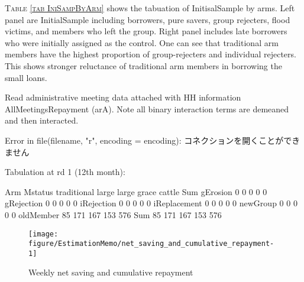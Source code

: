 \textsc{\normalsize Table \ref{tab IniSampByArm}} shows the tabuation of \textsf{InitisalSample} by arms. Left panel are \textsf{InitialSample} including borrowers, pure savers, group rejecters, flood victims, and members who left the group. Right panel includes late borrowers who were initially assigned as the control. One can see that \textsf{traditional} arm members have the highest proportion of group-rejecters and individual rejecters. This shows stronger reluctance of \textsf{traditional} arm members in borrowing the small loans. 


Read administrative meeting data attached with HH information \textsf{AllMeetingsRepayment} (\textsf{arA}). Note all binary interaction terms are demeaned and then interacted.
\begin{Schunk}
\begin{Soutput}
Error in file(filename, "r", encoding = encoding): コネクションを開くことができません
\end{Soutput}
\end{Schunk}

Tabulation at rd 1 (12th month):
\begin{Schunk}
\begin{Soutput}
              Arm
Mstatus        traditional large large grace cattle Sum
  gErosion               0     0           0      0   0
  gRejection             0     0           0      0   0
  iRejection             0     0           0      0   0
  iReplacement           0     0           0      0   0
  newGroup               0     0           0      0   0
  oldMember             85   171         167    153 576
  Sum                   85   171         167    153 576
\end{Soutput}
\end{Schunk}
\begin{Schunk}
\begin{figure}

{\centering \texttt{[image: figure/EstimationMemo/net\_saving\_and\_cumulative\_repayment-1]} 

}

\caption[Weekly net saving and cumulative repayment]{Weekly net saving and cumulative repayment}\label{Figure net saving and cumulative repayment}
\end{figure}
\end{Schunk}


